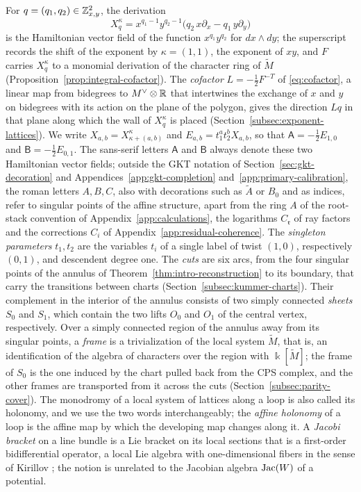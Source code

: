 For $q=(q_1,q_2)\in\mathbb Z^2_{x,y}$, the derivation
\[
 X^\kappa_q=x^{q_1-1}y^{q_2-1}\bigl(q_2\,x\partial_x-q_1\,y\partial_y\bigr)
\]
is the Hamiltonian vector field of the function $x^{q_1}y^{q_2}$ for
$dx\wedge dy$; the
superscript records the shift of the exponent by $\kappa=(1,1)$, the exponent
of $xy$, and $F$ carries $X^\kappa_q$ to a monomial derivation of the
character ring of $\widetilde M$ (Proposition~\ref{prop:integral-cofactor}).
The \emph{cofactor} $L=-\frac12F^{-T}$ of \eqref{eq:cofactor}, a linear map
from bidegrees to $M^\vee\otimes\mathbb R$ that intertwines the exchange of $x$
and $y$ on bidegrees with its action on the plane of the polygon, gives the
direction $Lq$ in that plane along which the wall of $X^\kappa_q$ is placed
(Section~\ref{subsec:exponent-lattices}).  We write $X_{a,b}=X^\kappa_{\kappa+(a,b)}$ and
$E_{a,b}=t_1^at_2^bX_{a,b}$, so that $\mathsf A=-\frac12E_{1,0}$ and
$\mathsf B=-\frac12E_{0,1}$.  The sans-serif letters $\mathsf A$ and
$\mathsf B$ always denote these two Hamiltonian vector fields; outside the
GKT notation of Section~\ref{sec:gkt-decoration} and
Appendices~\ref{app:gkt-completion} and~\ref{app:primary-calibration}, the
roman letters $A,B,C$, also with decorations such as $\widetilde A$ or $B_0$
and as indices, refer to singular points of the affine structure, apart from
the ring $A$ of the root-stack convention of Appendix~\ref{app:calculations},
the logarithms $C_{\mathfrak r}$ of ray factors and the corrections $C_i$ of
Appendix~\ref{app:residual-coherence}.  The
\emph{singleton parameters} $t_1,t_2$ are
the variables $t_i$ of a single label of twist $(1,0)$, respectively
$(0,1)$, and descendent degree one.  The \emph{cuts} are
six arcs, from the four singular points of the annulus of
Theorem~\ref{thm:intro-reconstruction} to its boundary, that carry the
transitions between charts (Section~\ref{subsec:kummer-charts}).  Their
complement in the interior of the annulus consists of two simply connected
\emph{sheets} $S_0$ and $S_1$, which contain the two lifts $O_0$ and $O_1$
of the central vertex, respectively.  Over a simply connected region of the
annulus away from its singular points, a \emph{frame} is a trivialization of the local
system $\widetilde M$, that is, an identification of the algebra of
characters over the region with $\Bbbk[\widetilde M]$; the frame of $S_0$ is
the one induced by the chart pulled back from the CPS complex, and the
other frames are transported from it across the cuts
(Section~\ref{subsec:parity-cover}).  The monodromy of a local system of
lattices along a loop is also called its holonomy, and we use the two words
interchangeably; the \emph{affine holonomy} of a loop is the affine map by
which the developing map changes along it.  A
\emph{Jacobi bracket} on a line bundle is a Lie bracket on its local
sections that is a first-order bidifferential operator, a local Lie algebra
with one-dimensional fibers in the sense of Kirillov
\cite{kirillov1976,lichnerowicz1978}; the notion is unrelated to the
Jacobian algebra $\operatorname{Jac}(W)$ of a potential.


